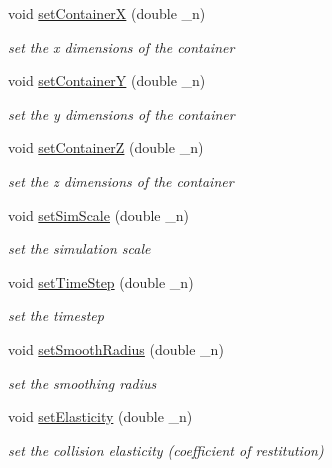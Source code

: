 \begin{DoxyCompactItemize}
void \hyperlink{classGLWindow_a76dc832a67b98c35c2fc0665a4cc8bb3}{setContainerX} (double \_\-n)
\begin{DoxyCompactList}\small\item\em set the x dimensions of the container \item\end{DoxyCompactList}\item 
void \hyperlink{classGLWindow_a283b661c79a468a57fcc215b1a285810}{setContainerY} (double \_\-n)
\begin{DoxyCompactList}\small\item\em set the y dimensions of the container \item\end{DoxyCompactList}\item 
void \hyperlink{classGLWindow_affc726d666957d1b07718626bb00bcd8}{setContainerZ} (double \_\-n)
\begin{DoxyCompactList}\small\item\em set the z dimensions of the container \item\end{DoxyCompactList}\item 
void \hyperlink{classGLWindow_a372a9f24fa394a1bd4863c2aa4d9f730}{setSimScale} (double \_\-n)
\begin{DoxyCompactList}\small\item\em set the simulation scale \item\end{DoxyCompactList}\item 
void \hyperlink{classGLWindow_a2d949af9af07c06de1b81402e6f590d4}{setTimeStep} (double \_\-n)
\begin{DoxyCompactList}\small\item\em set the timestep \item\end{DoxyCompactList}\item 
void \hyperlink{classGLWindow_a8573e617bde70803701f8163bd994683}{setSmoothRadius} (double \_\-n)
\begin{DoxyCompactList}\small\item\em set the smoothing radius \item\end{DoxyCompactList}\item 
void \hyperlink{classGLWindow_a80e51bff824a82ab5b1196eb79678383}{setElasticity} (double \_\-n)
\begin{DoxyCompactList}\small\item\em set the collision elasticity (coefficient of restitution) \item\end{DoxyCompactList}\item 

\end{DoxyCompactItemize}
